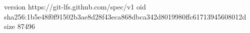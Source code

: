 version https://git-lfs.github.com/spec/v1
oid sha256:1b5e48f0f91502b3ae8d28f43eca868dbca342d8019980ffc61713945608012d
size 87496
